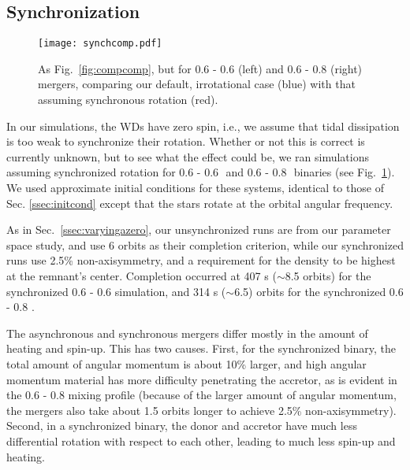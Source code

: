 \subsection{Synchronization}
\label{ssec:synchronization}

\begin{figure}
\centering
\texttt{[image: synchcomp.pdf]}
\caption{As Fig.~\ref{fig:compcomp}, but for 0.6 - 0.6 {\Msun} (left) and 0.6 - 0.8 {\Msun} (right) mergers, comparing our default, irrotational case (blue) with that assuming synchronous rotation (red).}
\label{fig:synchcomp}
\end{figure}

In our simulations, the WDs have zero spin, i.e., we assume that tidal dissipation is too weak to synchronize their rotation.  Whether or not this is correct is currently unknown, but to see what the effect could be, we ran simulations assuming synchronized rotation for 0.6 - 0.6\,\Msun\ and 0.6 - 0.8\,\Msun\ binaries (see Fig.~\ref{fig:synchcomp}).  We used approximate initial conditions for these systems, identical to those of Sec. \ref{ssec:initcond} except that the stars rotate at the orbital angular frequency.

As in Sec.~\ref{ssec:varyingazero}, our unsynchronized runs are from our parameter space study, and use 6 orbits as their completion criterion, while our synchronized runs use 2.5\% non-axisymmetry, and a requirement for the density to be highest at the remnant's center.  Completion occurred at 407 s ($\sim$8.5 orbits) for the synchronized 0.6 - 0.6 {\Msun} simulation, and 314 s ($\sim$6.5) orbits for the synchronized 0.6 - 0.8 {\Msun}.

The asynchronous and synchronous mergers differ mostly in the amount of heating and spin-up.  This has two causes.  First, for the synchronized binary, the total amount of angular momentum is about 10\% larger, and high angular momentum material has more difficulty penetrating the accretor, as is evident in the 0.6 - 0.8 {\Msun} mixing profile (because of the larger amount of angular momentum, the mergers also take about 1.5 orbits longer to achieve 2.5\% non-axisymmetry).  Second, in a synchronized binary, the donor and accretor have much less differential rotation with respect to each other, leading to much less spin-up and heating.

